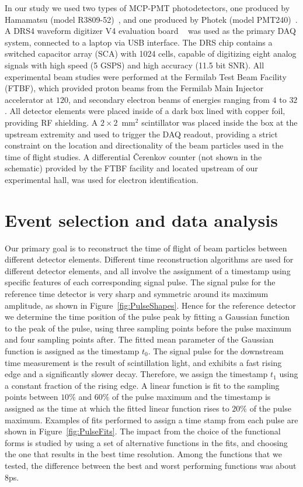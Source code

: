 In our study we used two types of MCP-PMT photodetectors, one produced by Hamamatsu 
(model R3809-52)~\cite{HamamatsuMCP3809}, and one produced by Photek (model
PMT240)~\cite{Photek240}. A DRS4  waveform digitizer V4 evaluation
board ~\cite{DRS4} was used as the primary DAQ system, connected to a laptop via
USB interface.  The DRS chip contains a switched capacitor array (SCA) with 1024 cells, 
capable of digitizing eight analog signals with high speed (5 GSPS) and high 
accuracy (11.5 bit SNR). All experimental beam studies were performed at the Fermilab Test
Beam Facility (FTBF), which provided proton beams from the Fermilab Main
Injector accelerator at $120$\GeV, and secondary electron beams of energies
ranging from $4$ to $32$\GeV. All detector elements were placed inside of a dark box
lined with copper foil, providing RF shielding. A $2\times2$~$\mathrm{mm}^{2}$
scintillator was placed inside the box at the upstream extremity and used to
trigger the DAQ readout, providing a strict constraint on the
location and directionality of the beam particles used in the time of flight
studies. A differential \v{C}erenkov counter (not shown in the schematic) provided by the FTBF
facility and located upstream of our experimental hall, was used for electron
identification. 

\section{Event selection and data analysis}

Our primary goal is to reconstruct the time of flight of beam particles between
different detector elements. Different time reconstruction algorithms are used
for different detector elements, and all involve the assignment of a timestamp
using specific features of each corresponding signal pulse. The signal pulse for
the reference time detector is very sharp and symmetric around its maximum
amplitude, as shown in Figure~\ref{fig:PulseShapes}. Hence for the reference
detector we determine the time position of the pulse peak by fitting a
Gaussian function to the peak of the pulse, using three sampling points before the pulse
maximum and four sampling points after. The fitted mean parameter of the
Gaussian function is assigned as the timestamp $t_{0}$. The signal pulse for the
downstream time measurement is the result of scintillation light, and exhibits a
fast rising edge and a significantly slower decay. Therefore, we assign the
timestamp $t_{1}$ using a constant fraction of the rising edge. A linear
function is fit to the sampling points between $10\%$ and $60\%$ of the pulse
maximum and the timestamp is assigned as the time at which the fitted linear
function rises to $20\%$ of the pulse maximum. Examples of fits performed to
assign a time stamp from each pulse are shown in Figure~\ref{fig:PulseFits}. The
impact from the choice of the functional forms is studied by using a set of
alternative functions in the fits, and choosing the one that results in the best
time resolution. Among the functions that we tested, the difference between the
best and worst performing functions was about 8\unit{ps}.

